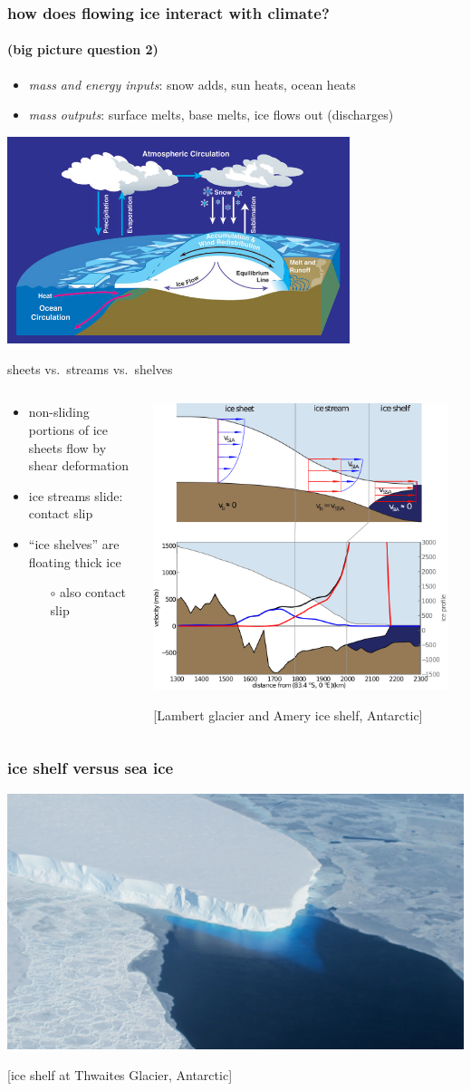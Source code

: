 \documentclass[10pt,hyperref={pdfpagelabels=true}]{beamer}
\newcommand{\contactslipslide}[1]{
\begin{frame}{#1 sheets vs.~streams vs.~shelves}

\begin{columns}
\begin{column}{0.35\textwidth}
\small
\begin{itemize}
\small
\item non-sliding portions of ice sheets flow by shear deformation
\item ice streams slide: \alert{contact slip}
\item ``ice shelves'' are floating thick ice
  \begin{itemize}
  \scriptsize
  \item[$\circ$] also \alert{contact slip}
  \end{itemize}
\end{itemize}
\end{column}

\begin{column}{0.65\textwidth}

\hfill\includegraphics[width=0.95\textwidth]{siassacartoon-lambert}

\begin{center}
\vspace{-0.18in}
\tiny [Lambert glacier and Amery ice shelf, Antarctic]
\end{center}
\end{column}
\end{columns}
\end{frame}
}
\begin{document}
\begin{frame}
  \frametitle{how does flowing ice interact with climate?}
  \framesubtitle{(big picture question 2)}

\medskip
\small
\begin{itemize}
\item \emph{mass and energy inputs}: snow adds, sun heats, ocean heats
\item \emph{mass outputs}: surface melts, base melts, ice flows out (discharges)
\end{itemize}

\begin{center}
  \includegraphics[width=0.75\textwidth]{mass-bal-atmos}
\end{center}
\end{frame}


\contactslipslide{}


\begin{frame}
  \frametitle{ice shelf versus sea ice}

\begin{center}
\vspace{-0.2in}

\includegraphics[width=1.0\textwidth]{supp4rignot-small}

\medskip
\tiny [ice shelf at Thwaites Glacier, Antarctic]
\end{center}
\end{frame}
\end{document}
